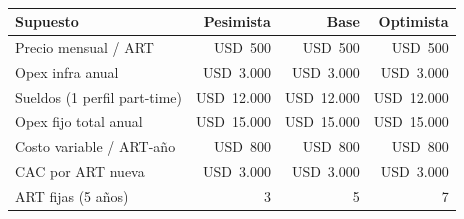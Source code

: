 \begin{table}[htbp]
\centering
\caption[Supuestos de los escenarios (USD)]{ \fuentepropia}
\label{tab:negocio-supuestos}
\small
\begin{tabular}{lrrr}
\hline
\textbf{Supuesto} & \textbf{Pesimista} & \textbf{Base} & \textbf{Optimista} \\
\hline
Precio mensual / ART & USD~500 & USD~500 & USD~500 \\
Opex infra anual & USD~3.000 & USD~3.000 & USD~3.000 \\
Sueldos (1 perfil part-time) & USD~12.000 & USD~12.000 & USD~12.000 \\
Opex fijo total anual & USD~15.000 & USD~15.000 & USD~15.000 \\
Costo variable / ART-a\~no & USD~800 & USD~800 & USD~800 \\
CAC por ART nueva & USD~3.000 & USD~3.000 & USD~3.000 \\
ART fijas (5 a\~nos) & 3 & 5 & 7 \\
\hline
\end{tabular}
\end{table}

